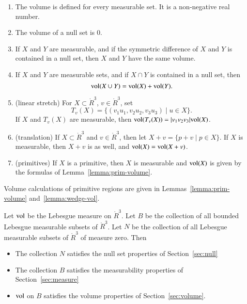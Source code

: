 \begin{enumerate}%
 \item The volume is defined for every measurable set.  It is
    a non-negative real number.
 \item The volume of a null set is $0$.
 \item If $X$ and $Y$ are  measurable, and if
 the symmetric difference of
 $X$ and $Y$ is contained in a null set, then 
    $X$ and $Y$ have the same volume.
 \item If $X$ and $Y$ are measurable sets, and if $X\cap
 Y$ is contained in a null set, then
    $$
    {\operatorname{vol}}(X\cup Y) = {\operatorname{vol}}(X) + {\operatorname{vol}}(Y).
    $$
%
%
  \item (linear stretch) For $X\subset \ring{R}^3$, $v\in\ring{R}^3$, 
    set 
      $$
      T_v(X) = \{ (v_1u_1,v_2u_2,v_3u_3) \mid u\in X\}.
      $$
%
    If $X$ and $T_v(X)$ are measurable, then
     ${\operatorname{vol}}(T_v(X)) = |v_1v_2v_3|{\operatorname{vol}}(X)$.
  \item (translation) If $X\subset \ring{R}^3$ and $v\in\ring{R}^3$, then let
    $X+v = \{p + v\mid p\in X\}$.  If $X$ is measurable, then $X+v$ is
    as well, and ${\operatorname{vol}}(X) = {\operatorname{vol}}(X+v)$.
  \item (primitives) If $X$ is a primitive, then $X$ is measurable
    and ${\operatorname{vol}}(X)$ is given by the formulas of Lemma~\ref{lemma:prim-volume}.
\end{enumerate}
%
%
%
Volume calculations of primitive regions are given in 
Lemmas~\ref{lemma:prim-volume} and~\ref{lemma:wedge-vol}.

\begin{lemma}
Let ${\operatorname{vol}}$ be the Lebesgue measure
on $\ring{R}^3$. Let $B$ be the collection of all bounded Lebesgue
measurable subsets of $\ring{R}^3$.  Let $N$ be the collection of all
Lebesgue measurable subsets of $\ring{R}^3$ of measure zero.
Then
\begin{itemize}
\item  The collection $N$ satisfies the null set properties of Section~\ref{sec:null}
\item The collection $B$ satisfies the measurability properties of Section~\ref{sec:measure}
\item  ${\operatorname{vol}}$ on $B$ satisfies the volume properties of Section~\ref{sec:volume}.  
%
\end{itemize}
\end{lemma}
%
%

